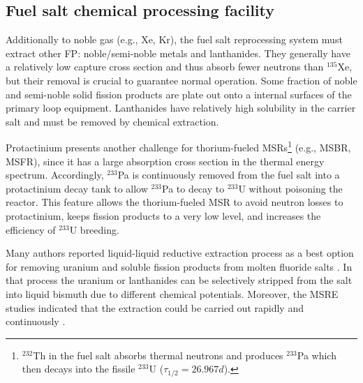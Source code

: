 \subsection{Fuel salt chemical processing facility} \label{sec:chemical_processing}
Additionally to noble gas (e.g., Xe, Kr), the fuel salt reprocessing system  
must extract other \gls{FP}: noble/semi-noble metals and lanthanides. They  
generally have a relatively low capture cross section and thus absorb fewer 
neutrons than $^{135}$Xe, but their removal is crucial to guarantee normal  
operation. Some fraction of noble and semi-noble solid fission products are 
plate out onto a internal surfaces of the primary loop equipment. Lanthanides 
have relatively high solubility in the carrier salt and must be removed by 
chemical extraction. 

Protactinium presents another challenge for thorium-fueled 
\glspl{MSR}\footnote{$^{232}$Th in the fuel salt absorbs thermal neutrons 
and produces $^{233}$Pa which then decays into the fissile $^{233}$U 
($\tau_{1/2}=26.967d$).} (e.g., 
\gls{MSBR}, \gls{MSFR}), since it has a large absorption
cross section in  
the thermal energy spectrum. Accordingly, $^{233}$Pa is continuously removed 
from the fuel salt into a protactinium
decay tank to allow $^{233}$Pa to decay 
to $^{233}$U without poisoning the reactor. This feature allows the 
thorium-fueled \gls{MSR} to avoid neutron losses
to protactinium, keeps 
fission products to a very low level, and increases the
efficiency of 
$^{233}$U breeding. 

Many authors reported liquid-liquid reductive extraction process as a best 
option for removing uranium and soluble fission products from 
molten fluoride salts \cite{briggs_molten-salt_1969, delpech_molten_2010, 
doligez_coupled_2014}. In that process the uranium or lanthanides can be 
selectively stripped from the salt into liquid bismuth due to different 
chemical potentials. Moreover, the \gls{MSRE} studies indicated that the 
extraction could be carried out rapidly and continuously  
\cite{whatley_engineering_1970-1}.

